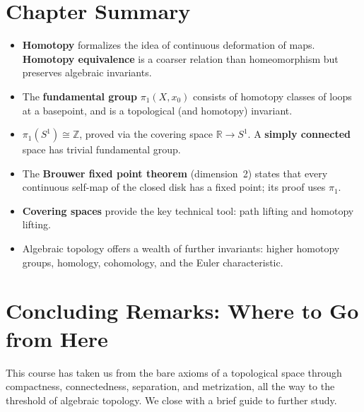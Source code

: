 \documentclass[11pt,a4paper,twoside]{book}
\theoremstyle{remark}
\theoremstyle{definition}
\theoremstyle{definition}
\begin{document}
\section*{Chapter Summary}

\begin{itemize}
  \item \textbf{Homotopy} formalizes the idea of continuous deformation
        of maps.  \textbf{Homotopy equivalence} is a coarser relation
        than homeomorphism but preserves algebraic invariants.
  \item The \textbf{fundamental group} $\pi_1(X,x_0)$ consists of
        homotopy classes of loops at a basepoint, and is a topological
        (and homotopy) invariant.
  \item $\pi_1(S^1)\cong\mathbb{Z}$, proved via the covering space
        $\mathbb{R}\to S^1$.  A \textbf{simply connected} space has
        trivial fundamental group.
  \item The \textbf{Brouwer fixed point theorem} (dimension~2) states
        that every continuous self-map of the closed disk has a fixed
        point; its proof uses $\pi_1$.
  \item \textbf{Covering spaces} provide the key technical tool:
        path lifting and homotopy lifting.
  \item Algebraic topology offers a wealth of further invariants:
        higher homotopy groups, homology, cohomology, and the Euler
        characteristic.
\end{itemize}

\section*{Concluding Remarks: Where to Go from Here}

This course has taken us from the bare axioms of a topological space
through compactness, connectedness, separation, and metrization, all
the way to the threshold of algebraic topology.  We close with a brief
guide to further study.
\end{document}
